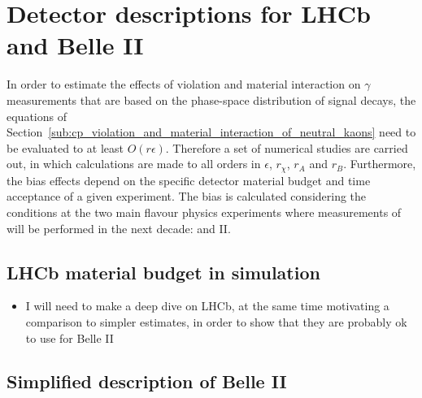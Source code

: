 
\section{Detector descriptions for LHCb and Belle II} %
\label{sec:detector_descriptions_for_lhcb_and_belle_ii}

In order to estimate the effects of \CP violation and material interaction on $\gamma$ measurements that are based on the phase-space distribution of signal decays, the equations of Section~\ref{sub:cp_violation_and_material_interaction_of_neutral_kaons} need to be evaluated to at least $O(r\epsilon)$. Therefore a set of numerical studies are carried out, in which calculations are made to all orders in $\epsilon$, $r_\chi$, $r_A$ and $r_B$. Furthermore, the bias effects depend on the specific detector material budget and time acceptance of a given experiment. The bias is calculated considering the conditions at the two main flavour physics experiments where measurements of \g will be performed in the next decade: \lhcb and \belle II. 


\subsection{LHCb material budget in simulation} %
\label{sub:lhcb_material_budget_in_simulation}

\begin{itemize}
    \item I will need to make a deep dive on LHCb, at the same time motivating a comparison to simpler estimates, in order to show that they are probably ok to use for Belle II
\end{itemize}


\subsection{Simplified description of Belle II} %
\label{sub:simplified_description_of_belle_ii}

